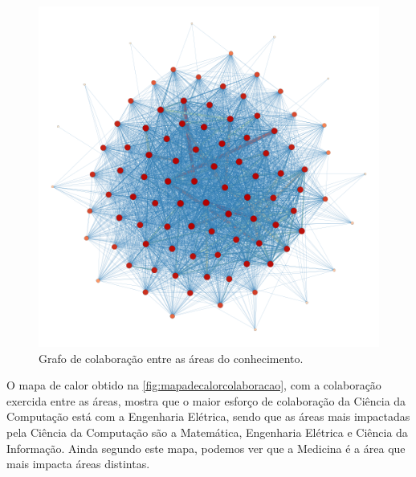 \begin{figure}[htpb]
  \centering
  \includegraphics[width=1\textwidth]{figuras/resultados-grafo-colaboracao-entre-areas}
  \caption{Grafo de colaboração entre as áreas do conhecimento.}
  \label{fig:grafocolaboracao}
\end{figure}

O mapa de calor obtido na \autoref{fig:mapadecalorcolaboracao}, com a colaboração exercida entre as áreas, mostra que o maior esforço de colaboração da Ciência da Computação está com a Engenharia Elétrica, sendo que as áreas mais impactadas pela Ciência da Computação são a Matemática, Engenharia Elétrica e Ciência da Informação. Ainda segundo este mapa, podemos ver que a Medicina é a área que mais impacta áreas distintas.

